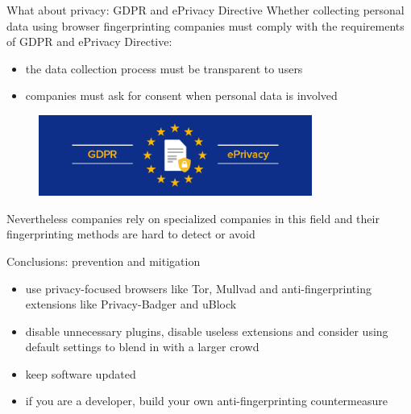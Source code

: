 \begin{frame}{What about privacy: GDPR and ePrivacy Directive}
  Whether collecting personal data using browser fingerprinting companies must comply with the requirements of GDPR and ePrivacy Directive:
  \begin{itemize}
    \item the data collection process must be transparent to users
    \item companies must ask for consent when personal data is involved
  \end{itemize}
  \begin{figure}
    \centering
    \includegraphics[width=0.8\textwidth]{images/privacy.png}
  \end{figure}
  Nevertheless companies rely on specialized companies in this field and their fingerprinting methods are hard to detect or avoid
\end{frame}

\begin{frame}{Conclusions: prevention and mitigation}
  \begin{itemize}
    \item use privacy-focused browsers like Tor, Mullvad and anti-fingerprinting extensions like Privacy-Badger and uBlock
          \vspace{0.5cm}
    \item disable unnecessary plugins, disable useless extensions and consider using default settings to blend in with a larger crowd
          \vspace{0.5cm}
    \item keep software updated
          \vspace{0.5cm}
    \item if you are a developer, build your own anti-fingerprinting countermeasure
  \end{itemize}
\end{frame}